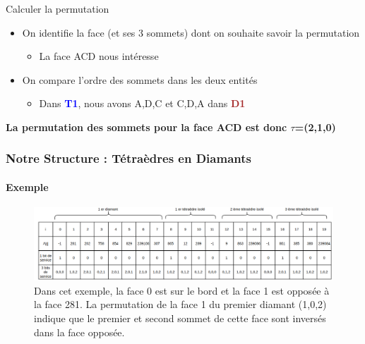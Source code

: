 \documentclass[9pt]{beamer}
\begin{document}
\begin{frame}
\begin{block}{Calculer la permutation}
\begin{itemize}
\item On identifie la face (et ses 3 sommets) dont on souhaite savoir la permutation
\begin{itemize}
\scriptsize
\item La face ACD nous intéresse
\end{itemize}
\item On compare l'ordre des sommets dans les deux entités
\begin{itemize}
\scriptsize
\item Dans \textcolor{blue}{\textbf{T1}}, nous avons A,D,C et C,D,A dans \textcolor{brown}{\textbf{D1}} 
\end{itemize}
\end{itemize}
\textbf{La permutation des sommets pour la face ACD est donc $\tau$=(2,1,0)}
\end{block}
\end{frame}


\begin{frame}
\small
\frametitle{Notre Structure : Tétraèdres en Diamants}
\framesubtitle{Exemple}
\begin{figure}[H]
\begin{center}
\includegraphics[scale=0.275]{Images/structure}
\caption{Dans cet exemple, la face 0 est sur le bord et la face 1 est opposée à la face 281. La permutation de la face 1 du premier diamant (1,0,2) indique que le premier et second sommet de cette face sont inversés dans la face opposée.}
\label{fig:structure}
\end{center}
\end{figure}





\end{frame}
\end{document}
